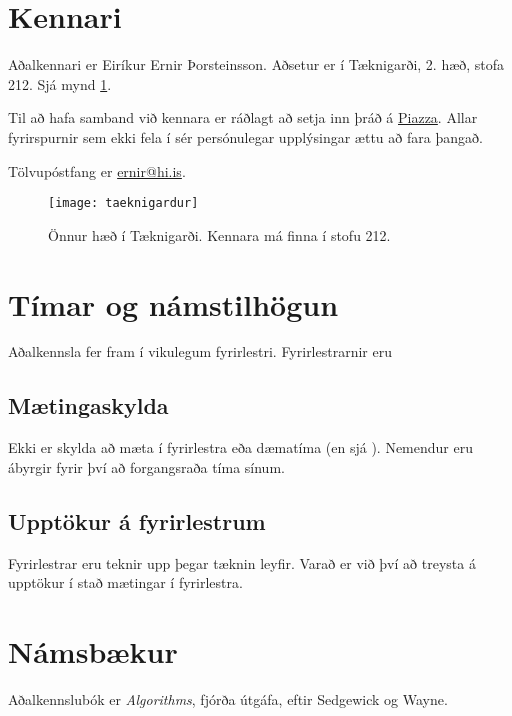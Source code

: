 \documentclass{article}
\begin{document}
\section{Kennari}
Aðalkennari er Eiríkur Ernir Þorsteinsson. Aðsetur er í Tæknigarði, 2. hæð, stofa 212. Sjá mynd \ref{fig:taeknigardur}.

Til að hafa samband við kennara er ráðlagt að setja inn þráð á \href{???}{Piazza}. Allar fyrirspurnir sem ekki fela í sér persónulegar upplýsingar ættu að fara þangað. 

Tölvupóstfang er \href{mailto:ernir@hi.is}{ernir@hi.is}.

\begin{figure}
\caption{Önnur hæð í Tæknigarði. Kennara má finna í stofu 212.}
\label{fig:taeknigardur}
\begin{center}
\texttt{[image: taeknigardur]}
\end{center}
\end{figure}

\section{Tímar og námstilhögun}
Aðalkennsla fer fram í vikulegum fyrirlestri. Fyrirlestrarnir eru %


\subsection{Mætingaskylda}
Ekki er skylda að mæta í fyrirlestra eða dæmatíma (en sjá ). Nemendur eru ábyrgir fyrir því að forgangsraða tíma sínum.
\subsection{Upptökur á fyrirlestrum}
Fyrirlestrar eru teknir upp þegar tæknin leyfir. Varað er við því að treysta á upptökur í stað mætingar í fyrirlestra.

\section{Námsbækur}
Aðalkennslubók er \emph{Algorithms}, fjórða útgáfa, eftir Sedgewick og Wayne. %
\end{document}
